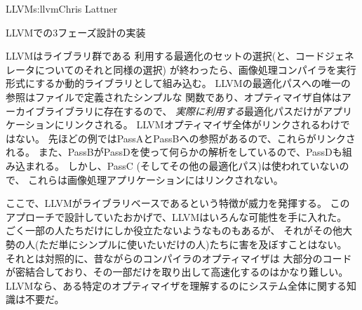 \begin{aosachapter}{LLVM}{s:llvm}{Chris Lattner}
\begin{aosasect1}{LLVMでの3フェーズ設計の実装}
\begin{aosasect2}{LLVMはライブラリ群である}
利用する最適化のセットの選択(と、コードジェネレータについてのそれと同様の選択)
が終わったら、画像処理コンパイラを実行形式にするか動的ライブラリとして組み込む。
LLVMの最適化パスへの唯一の参照はファイルで定義されたシンプルな
関数であり、オプティマイザ自体はアーカイブライブラリに存在するので、
\emph{実際に利用する}最適化パスだけがアプリケーションにリンクされる。
LLVMオプティマイザ全体がリンクされるわけではない。
先ほどの例ではPassAとPassBへの参照があるので、これらがリンクされる。
また、PassBがPassDを使って何らかの解析をしているので、PassDも組み込まれる。
しかし、PassC (そしてその他の最適化パス)は使われていないので、
これらは画像処理アプリケーションにはリンクされない。

ここで、LLVMがライブラリベースであるという特徴が威力を発揮する。
このアプローチで設計していたおかげで、LLVMはいろんな可能性を手に入れた。
ごく一部の人たちだけにしか役立たないようなものもあるが、
それがその他大勢の人(ただ単にシンプルに使いたいだけの人)たちに害を及ぼすことはない。
それとは対照的に、昔ながらのコンパイラのオプティマイザは
大部分のコードが密結合しており、その一部だけを取り出して高速化するのはかなり難しい。
LLVMなら、ある特定のオプティマイザを理解するのにシステム全体に関する知識は不要だ。


\end{aosasect2}
\end{aosasect1}
\end{aosachapter}
